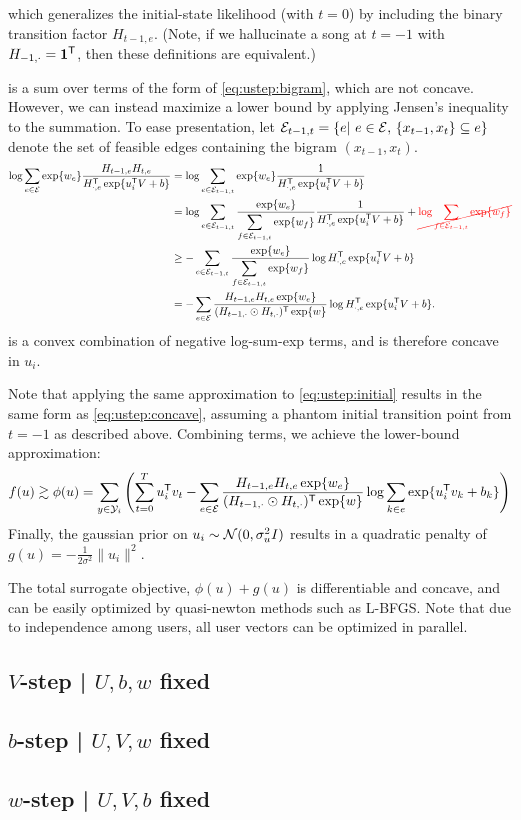 \documentclass{article}
\newcommand{\ccancel}[2][black]{\color{#1}\cancel{#2}\normalcolor}
\def\E{\ensuremath{\mathcal{E}}}
\begin{document}
which generalizes the initial-state likelihood (with $t=0$) by including the binary transition factor $H_{t-1,e}$.  
(Note, if we hallucinate a song at $t=-1$ with $H_{-1,\cdot} = \mathbf{1}^\mathsf{T}$, then these definitions are equivalent.)

 is a sum over terms of the form of \cref{eq:ustep:bigram}, which are not concave.  However, we can instead maximize a lower bound by applying Jensen's inequality to
the summation.  To ease presentation, let ${\E_{t-1,t} = \{e \given e \in \E,\, \{x_{t-1}, x_{t}\} \subseteq e\}}$ denote the set of feasible edges containing the bigram $(x_{t-1}, x_t)$.
\begin{align}
\log\sum_{e\in \E} \exp\{w_e\} \frac{H_{t-1,e} H_{t, e} }{H_{\cdot,e}\trans \exp\{u_i\trans V + b \} }
&= \log\sum_{e \in \E_{t-1,t}} \exp\{w_e\} \frac{1}{H_{\cdot, e}\trans \exp\{u_i\trans V + b\} }\notag\\
&= \log\sum_{e \in \E_{t-1,t}} \frac{\exp\{w_e\}}{\displaystyle\sum_{f\in\E_{t-1,t}} \exp\{w_f\}} \frac{1}{H_{\cdot, e}\trans \exp\{u_i\trans V + b\} } + \ccancel[red]{\log \sum_{f \in \E_{t-1,t}} \exp\{w_f\}}\notag\\
&\geq -\sum_{e \in \E_{t-1,t}} \frac{\exp\{w_e\}}{\displaystyle\sum_{f\in\E_{t-1,t}} \exp\{w_f\}} \log H_{\cdot, e}\trans \exp\{u_i\trans V + b\}  \notag\\
&= -\sum_{e\in\E} \frac{H_{t-1,e} H_{t,e} \exp\{w_e\}}{ (H_{t-1,\cdot} \odot H_{t,\cdot})\trans \exp\{w\}} \log H_{\cdot, e}\trans \exp\{u_i\trans V + b\}  \label{eq:ustep:concave}.
\end{align}
 is a convex combination of negative log-sum-exp terms, and is therefore concave in $u_i$.  

Note that applying the same approximation to \cref{eq:ustep:initial} results in the same form as \cref{eq:ustep:concave}, assuming a phantom initial transition point from $t=-1$ 
as described above.  Combining terms, we achieve the lower-bound approximation:
\begin{equation}
f(u) \gtrsim \phi(u) = \sum_{y \in \Y_i} \left(\sum_{t=0}^T u_i\trans v_t - \sum_{e \in \E} \frac{H_{t-1,e} H_{t,e} \exp\{w_e\}}{ (H_{t-1,\cdot}\odot H_{t,\cdot})\trans \exp\{w\}} \log
\sum_{k\in e} \exp\{u_i\trans v_k + b_k\} \right)
\end{equation}
Finally, the gaussian prior on $u_i \sim \mathcal{N}(0, \sigma_u^2 I)$ results in a quadratic penalty of $g(u) = -\frac{1}{2\sigma^2}\|u_i\|^2$.

The total surrogate objective, $\phi(u) + g(u)$ is differentiable and concave, and can be easily optimized by quasi-newton methods such as L-BFGS.
Note that due to independence among users, all user vectors can be optimized in parallel.

\subsection{$V$-step | $U, b, w$ fixed}

\subsection{$b$-step | $U, V, w$ fixed}

\subsection{$w$-step | $U, V, b$ fixed}
\end{document}

